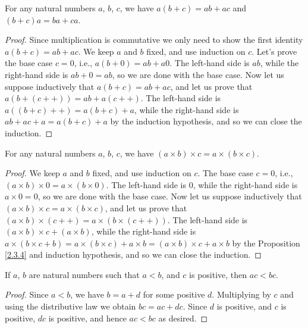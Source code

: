\begin{proposition}\label{2.3.4}
For any natural numbers \(a\), \(b\), \(c\), we have \(a(b + c) = ab + ac\) and \((b + c)a = ba + ca\).
\end{proposition}

\begin{proof}
Since multiplication is commutative we only need to show the first identity \(a(b + c) = ab + ac\).
We keep \(a\) and \(b\) fixed, and use induction on \(c\).
Let’s prove the base case \(c = 0\), i.e., \(a(b + 0) = ab + a0\).
The left-hand side is \(ab\), while the right-hand side is \(ab + 0 = ab\), so we are done with the base case.
Now let us suppose inductively that \(a(b + c) = ab + ac\), and let us prove that \(a(b + (c++)) = ab + a(c++)\).
The left-hand side is \(a((b + c)++) = a(b + c) + a\), while the right-hand side is \(ab + ac + a = a(b + c) + a\) by the induction hypothesis, and so we can close the induction.
\end{proof}

\begin{proposition}\label{2.3.5}
For any natural numbers \(a\), \(b\), \(c\), we have \((a \times b) \times c = a \times (b \times c)\).
\end{proposition}

\begin{proof}
We keep \(a\) and \(b\) fixed, and use induction on \(c\).
The base case \(c = 0\), i.e., \((a \times b) \times 0 = a \times (b \times 0)\).
The left-hand side is \(0\), while the right-hand side is \(a \times 0 = 0\), so we are done with the base case.
Now let us suppose inductively that \((a \times b) \times c = a \times (b \times c)\), and let us prove that \((a \times b) \times (c++) = a \times (b \times (c++))\).
The left-hand side is \((a \times b) \times c + (a \times b)\), while the right-hand side is \(a \times (b \times c + b) = a \times (b \times c) + a \times b = (a \times b) \times c + a \times b\) by the Proposition \ref{2.3.4} and induction hypothesis, and so we can close the induction.
\end{proof}

\begin{proposition}\label{2.3.6}
If \(a\), \(b\) are natural numbers such that \(a < b\), and \(c\) is positive, then \(ac < bc\).
\end{proposition}

\begin{proof}
Since \(a < b\), we have \(b = a + d\) for some positive \(d\).
Multiplying by \(c\) and using the distributive law we obtain \(bc = ac + dc\).
Since \(d\) is positive, and \(c\) is positive, \(dc\) is positive, and hence \(ac < bc\) as desired.
\end{proof}

